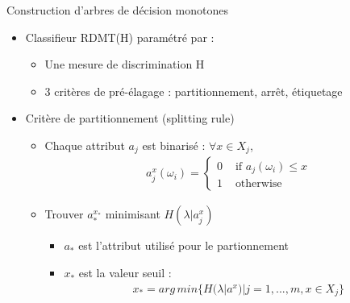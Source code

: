 \documentclass{beamer}
\newcommand{\beamcite}[1]{\hfill {\footnotesize \textcite{#1}}}
\begin{document}
\begin{frame}{Construction d'arbres de décision monotones \beamcite{marsala-rank}}
    \begin{itemize}
        \item Classifieur RDMT(H) paramétré par : 
            \begin{itemize}
                \item Une mesure de discrimination H
                \item 3 critères de pré-élagage : partitionnement, arrêt, étiquetage
            \end{itemize}
        \item Critère de partitionnement (splitting rule)
            \begin{itemize}
                \item Chaque attribut $a_j$ est binarisé : $\forall x \in X_j$,
                    \begin{equation*}
                    \begin{array}{cl}
                        a^x_j(\omega_i) = \begin{cases}{0} &\text{ if } a_j(\omega_i) \leq x\\
                          {1} &\text{ otherwise}\end{cases}
                     \end{array}
                     \end{equation*}
                \item Trouver $a^{x_*}_*$ minimisant $H(\lambda|a^x_j)$
                    \begin{itemize}
                        \item $a_*$ est l'attribut utilisé pour le partionnement
                        \item $x_*$ est la valeur seuil : 
                            \begin{equation*}
                            \begin{array}{cl}
                                x_* = arg\,min \{H(\lambda|a^x) | j=1,...,m, x \in X_j\}
                            \end{array}
                            \end{equation*}
                    \end{itemize}
            \end{itemize}
    \end{itemize}
\end{frame}
\end{document}
